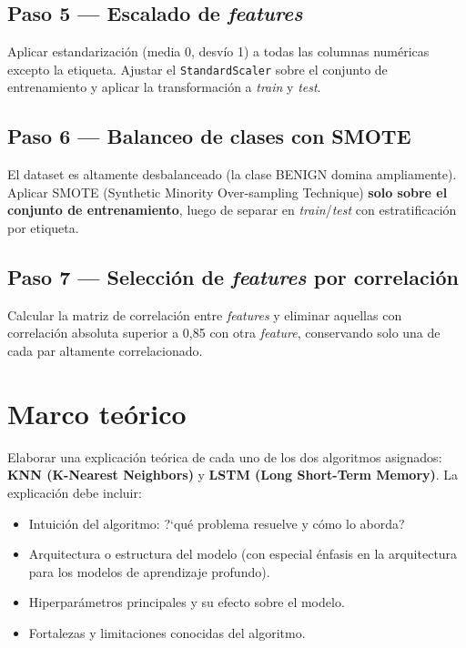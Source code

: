 \documentclass[11pt,a4paper]{article}
\newcommand{\codigo}[1]{\texttt{#1}}
\begin{document}
\subsection*{Paso 5 --- Escalado de \textit{features}}
Aplicar estandarizaci\'on (media 0, desv\'io 1) a todas las columnas num\'ericas excepto la etiqueta. Ajustar el \codigo{StandardScaler} sobre el conjunto de entrenamiento y aplicar la transformaci\'on a \textit{train} y \textit{test}.

\subsection*{Paso 6 --- Balanceo de clases con SMOTE}
El dataset es altamente desbalanceado (la clase BENIGN domina ampliamente). Aplicar SMOTE (Synthetic Minority Over-sampling Technique) \textbf{solo sobre el conjunto de entrenamiento}, luego de separar en \textit{train}/\textit{test} con estratificaci\'on por etiqueta.

\subsection*{Paso 7 --- Selecci\'on de \textit{features} por correlaci\'on}
Calcular la matriz de correlaci\'on entre \textit{features} y eliminar aquellas con correlaci\'on absoluta superior a 0,85 con otra \textit{feature}, conservando solo una de cada par altamente correlacionado.

\section{Marco te\'orico}
Elaborar una explicaci\'on te\'orica de cada uno de los dos algoritmos asignados: \textbf{KNN (K-Nearest Neighbors)} y \textbf{LSTM (Long Short-Term Memory)}. La explicaci\'on debe incluir:
\begin{itemize}[leftmargin=2em,itemsep=2pt]
    \item Intuici\'on del algoritmo: ?`qu\'e problema resuelve y c\'omo lo aborda?
    \item Arquitectura o estructura del modelo (con especial \'enfasis en la arquitectura para los modelos de aprendizaje profundo).
    \item Hiperpar\'ametros principales y su efecto sobre el modelo.
    \item Fortalezas y limitaciones conocidas del algoritmo.
\end{itemize}
\end{document}
